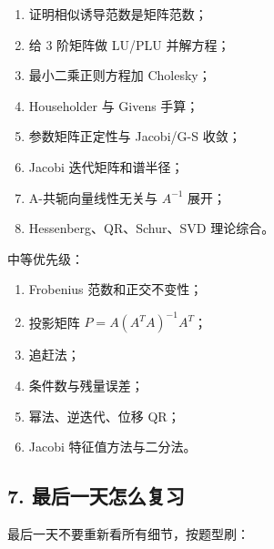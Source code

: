 \documentclass[11pt,a4paper]{ctexart}
\begin{document}
\begin{enumerate}

\item 证明相似诱导范数是矩阵范数；

\item 给 3 阶矩阵做 LU/PLU 并解方程；

\item 最小二乘正则方程加 Cholesky；

\item Householder 与 Givens 手算；

\item 参数矩阵正定性与 Jacobi/G-S 收敛；

\item Jacobi 迭代矩阵和谱半径；

\item A-共轭向量线性无关与 $A^{-1}$ 展开；

\item Hessenberg、QR、Schur、SVD 理论综合。

\end{enumerate}

中等优先级：

\begin{enumerate}

\item Frobenius 范数和正交不变性；

\item 投影矩阵 $P=A(A^TA)^{-1}A^T$；

\item 追赶法；

\item 条件数与残量误差；

\item 幂法、逆迭代、位移 QR；

\item Jacobi 特征值方法与二分法。

\end{enumerate}


\subsection*{7. 最后一天怎么复习}


最后一天不要重新看所有细节，按题型刷：
\end{document}
